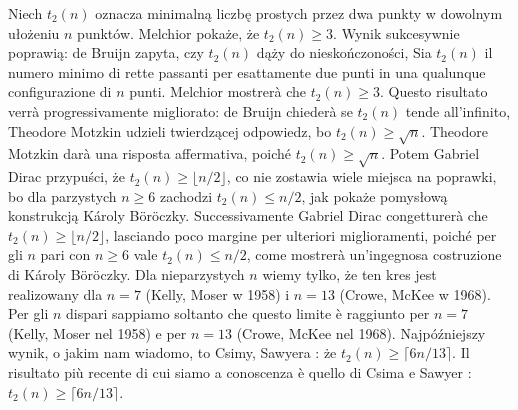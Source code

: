 Niech $t_2(n)$ oznacza minimalną liczbę prostych przez dwa punkty w dowolnym ułożeniu $n$ punktów. %
Melchior pokaże, że $t_2(n) \ge 3$. %
Wynik sukcesywnie poprawią: %
de Bruijn \cite{debruijn_1948} zapyta, czy $t_2(n)$ dąży do nieskończoności, %
Sia $t_2(n)$ il numero minimo di rette passanti per esattamente due punti in una qualunque configurazione di $n$ punti. %
Melchior mostrerà che $t_2(n) \ge 3$. %
Questo risultato verrà progressivamente migliorato: %
de Bruijn \cite{debruijn_1948} chiederà se $t_2(n)$ tende all'infinito, %
%
Theodore Motzkin \cite{motzkin_1951} udzieli twierdzącej odpowiedz, bo $t_2(n) \ge \sqrt{n}$. %
Theodore Motzkin \cite{motzkin_1951} darà una risposta affermativa, poiché $t_2(n) \ge \sqrt{n}$. %
%
Potem Gabriel Dirac \cite{dirac_1951} przypuści, że $t_2(n) \ge \lfloor n/2\rfloor$, co nie zostawia wiele miejsca na poprawki, bo dla parzystych $n \ge 6$ zachodzi $t_2(n) \le n/2$, jak pokaże pomysłową konstrukcją Károly Böröczky. %
Successivamente Gabriel Dirac \cite{dirac_1951} congetturerà che $t_2(n) \ge \lfloor n/2\rfloor$, lasciando poco margine per ulteriori miglioramenti, poiché per gli $n$ pari con $n \ge 6$ vale $t_2(n) \le n/2$, come mostrerà un'ingegnosa costruzione di Károly Böröczky. %
%
%
Dla nieparzystych $n$ wiemy tylko, że ten kres jest realizowany dla $n = 7$ (Kelly, Moser \cite{kelly_1958} w 1958) i $n = 13$ (Crowe, McKee \cite{mckee_1968} w 1968). %
Per gli $n$ dispari sappiamo soltanto che questo limite è raggiunto per $n = 7$ (Kelly, Moser \cite{kelly_1958} nel 1958) e per $n = 13$ (Crowe, McKee \cite{mckee_1968} nel 1968). %
%
%
%
Najpóźniejszy wynik, o jakim nam wiadomo, to Csimy, Sawyera \cite{csima_1993}: że $t_2(n) \ge \lceil 6n/13 \rceil$. %
Il risultato più recente di cui siamo a conoscenza è quello di Csima e Sawyer \cite{csima_1993}: $t_2(n) \ge \lceil 6n/13 \rceil$. %
%
%


%
